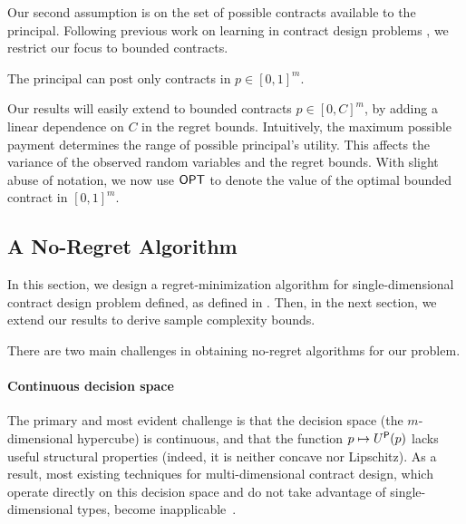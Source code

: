 Our second assumption is on the set of possible contracts available to the principal. Following previous work on learning in contract design problems \citep{bacchiocchi2023learning,zhu2022online,chen2024bounded,ho2014adaptive}, we restrict our focus to bounded contracts.
%
\begin{assumption}\label{ass:boundedContract}
	The principal can post only contracts in $p\in [0,1]^m$.%
\end{assumption}
%
Our results will easily extend to bounded contracts $p\in [0,C]^m$, by adding a linear dependence on $C$ in the regret bounds. Intuitively, the maximum possible payment determines the range of possible principal's utility. This affects the variance of the observed random variables and the regret bounds.
%
With slight abuse of notation, we now use $\textsf{OPT}$ to denote the value of the optimal bounded contract in $[0,1]^m$.


\subsection{A No-Regret Algorithm}

In this section, we design a regret-minimization algorithm for single-dimensional contract design problem defined, as defined in . Then, in the next section, we extend our results to derive sample complexity bounds.

There are two main challenges in obtaining no-regret algorithms for our problem.

\paragraph{Continuous decision space} The primary and most evident  challenge is that the decision space (the $m$-dimensional hypercube) is continuous, and that the function $p\mapsto U^\textsf{P}(p)$ lacks useful structural properties (indeed, it is neither concave nor Lipschitz). As a result, most existing techniques for multi-dimensional contract design, which operate directly on this decision space and do not take advantage of single-dimensional types, become inapplicable~\cite{zhu2022online,bacchiocchi2023learning,ho2014adaptive}.

